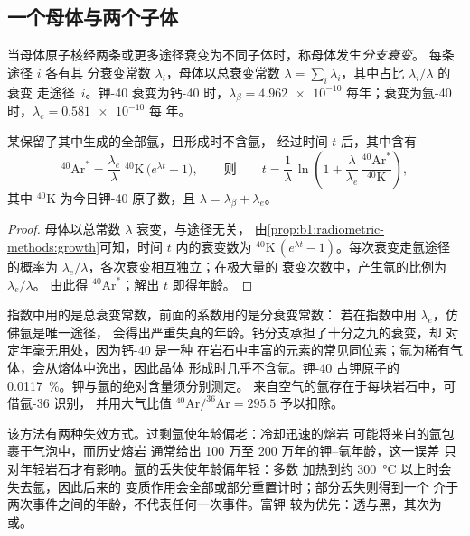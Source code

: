 \subsection*{一个母体与两个子体}

\begin{definition}[分支衰变]\label{def:b1:radiometric-methods:branching}
当母体原子核经两条或更多途径衰变为不同子体时，称母体发生\emph{分支衰变}。
每条途径 $i$ 各有其
分衰变常数 $\lambda_i$，母体以总衰变常数
$\lambda = \sum_i \lambda_i$，其中占比 $\lambda_i/\lambda$ 的衰变
走途径~$i$。钾-40 衰变为钙-40 时，$\lambda_\beta =
\num{4.962e-10}$ 每年；衰变为氩-40 时，$\lambda_e = \num{0.581e-10}$ 每
年。
\end{definition}

\begin{proposition}[钾–氩年龄]\label{prop:b1:radiometric-methods:kar}
某保留了其中生成的全部氩，且形成时不含氩，
经过时间 $t$ 后，其中含有
\[
  {}^{40}\mathrm{Ar}^* = \frac{\lambda_e}{\lambda}\;{}^{40}\mathrm{K}\,\bigl(e^{\lambda t} - 1\bigr),
  \qquad\text{则}\qquad
  t = \frac{1}{\lambda}\,\ln\!\left(1 + \frac{\lambda}{\lambda_e}\,
      \frac{{}^{40}\mathrm{Ar}^*}{{}^{40}\mathrm{K}}\right),
\]
其中 ${}^{40}\mathrm{K}$ 为今日钾-40 原子数，且 $\lambda =
\lambda_\beta + \lambda_e$。
\end{proposition}

\begin{proof}
母体以总常数 $\lambda$ 衰变，与途径无关，
由\cref{prop:b1:radiometric-methods:growth}可知，时间 $t$ 内的衰变数为
${}^{40}\mathrm{K}\,(e^{\lambda t} - 1)$。每次衰变走氩途径的概率为
$\lambda_e/\lambda$，各次衰变相互独立；在极大量的
衰变次数中，产生氩的比例为 $\lambda_e/\lambda$。
由此得 ${}^{40}\mathrm{Ar}^*$；解出 $t$ 即得年龄。
\end{proof}

指数中用的是总衰变常数，前面的系数用的是分衰变常数：
若在指数中用 $\lambda_e$，仿佛氩是唯一途径，
会得出严重失真的年龄。钙分支承担了十分之九的衰变，却
对定年毫无用处，因为钙-40 是一种
在岩石中丰富的元素的常见同位素；氩为稀有气体，会从熔体中逸出，因此晶体
形成时几乎不含氩。钾-40 占钾原子的
\qty{0.0117}{\percent}。钾与氩的绝对含量须分别测定。
来自空气的氩存在于每块岩石中，可借氩-36 识别，
并用大气比值
$^{40}\mathrm{Ar}/^{36}\mathrm{Ar} = 295.5$ 予以扣除。

该方法有两种失效方式。过剩氩使年龄偏老：冷却迅速的熔岩
可能将来自的氩包裹于气泡中，而历史熔岩
通常给出 100 万至 200 万年的钾–氩年龄，这一误差
只对年轻岩石才有影响。氩的丢失使年龄偏年轻：多数
加热到约 \qty{300}{\celsius} 以上时会失去氩，因此后来的
变质作用会全部或部分重置计时；部分丢失则得到一个
介于两次事件之间的年龄，不代表任何一次事件。富钾
较为优先：透与黑，其次为或。

